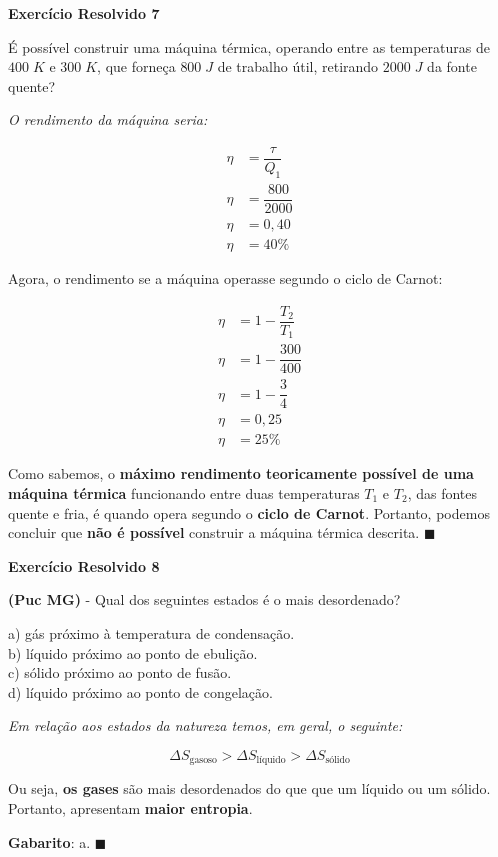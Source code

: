 \documentclass[12pt]{article}
\newenvironment{resposta*}
{\bf Resposta:\\ }
{}
\begin{document}
\textbf{Exercício Resolvido 7}


É possível construir uma máquina térmica, operando entre as temperaturas de $400\;K$ e $300\;K$, que forneça $800\;J$ de trabalho útil, retirando $2000\;J$ da fonte quente?


\begin{resposta*}
{\it O rendimento da máquina seria:

\begin{align*}
    \eta &= \dfrac{\tau}{Q_{1}} \\
    \eta &= \dfrac{800}{2000} \\
    \eta &= 0,40 \\
    \eta &= 40\%
\end{align*}

Agora, o rendimento se a máquina operasse segundo o ciclo de Carnot:

\begin{align*}
    \eta &= 1 - \dfrac{T_{2}}{T_{1}} \\
    \eta &= 1 - \dfrac{300}{400} \\
    \eta &= 1 - \dfrac{3}{4} \\
    \eta &= 0,25 \\
    \eta &= 25\%
\end{align*}

Como sabemos, o \textbf{máximo rendimento teoricamente possível de uma máquina térmica} funcionando entre duas temperaturas $T_{1}$ e $T_{2}$, das fontes quente e fria, é quando opera segundo o \textbf{ciclo de Carnot}. Portanto, podemos concluir que \textbf{não é possível} construir a máquina térmica descrita. $\blacksquare$}
\end{resposta*}

\textbf{Exercício Resolvido 8}


\textbf{(Puc MG)} - Qual dos seguintes estados é o mais desordenado?


a) gás próximo à temperatura de condensação. \\
b) líquido próximo ao ponto de ebulição. \\
c) sólido próximo ao ponto de fusão. \\
d) líquido próximo ao ponto de congelação.


\begin{resposta*}
{\it Em relação aos estados da natureza temos, em geral, o seguinte:

\begin{equation*}
    \Delta S_{\text{gasoso}}>\Delta S_{\text{líquido}}>\Delta S_{\text{sólido}}
\end{equation*}

Ou seja, \textbf{os gases} são mais desordenados do que que um líquido ou um sólido. Portanto, apresentam \textbf{maior entropia}.

\textbf{Gabarito}: a. $\blacksquare$}
\end{resposta*}
\end{document}
